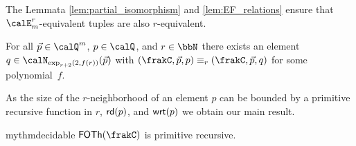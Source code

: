 The Lemmata \ref{lem:partial_isomorphism} and \ref{lem:EF_relations} ensure that $\calE^r_m$-equivalent tuples are also $r$-equivalent.

\begin{corollary}\label{cor:equivalence}
	For all $\vec{p}\in \Qx^m$, $p\in \Qx$, and $r\in\bbN$ there exists an element $q\in \calN_{\exp_{r+2}(2,f(r))}(\vec{p})$ with $(\frakC, \vec{p}, p) \equiv_r (\frakC,\vec{p}, q)$ for some polynomial~$f$.
\end{corollary}
As the size of the $r$-neighborhood of an element $p$ can be bounded by a primitive recursive function in $r$, $\mathsf{rd}(p)$, and $\mathsf{wrt}(p)$ we obtain our main result.
\begin{restatable}{mythm}{decidable}
	$\FOTh{\frakC}$ is primitive recursive.
\end{restatable}
